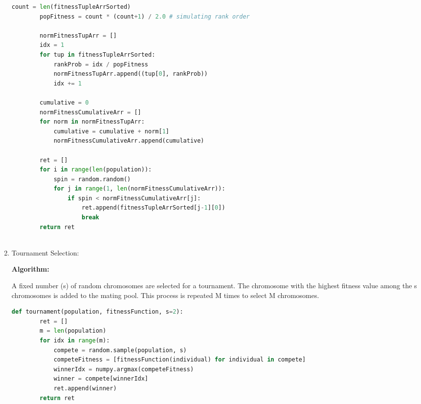 \documentclass[12pt,a4paper]{article}
\begin{document}
\begin{enumerate}
\begin{lstlisting}[language=Python]
        count = len(fitnessTupleArrSorted)
        popFitness = count * (count+1) / 2.0 # simulating rank order
    
        normFitnessTupArr = []
        idx = 1
        for tup in fitnessTupleArrSorted:
            rankProb = idx / popFitness
            normFitnessTupArr.append((tup[0], rankProb))
            idx += 1
    
        cumulative = 0
        normFitnessCumulativeArr = []
        for norm in normFitnessTupArr:
            cumulative = cumulative + norm[1]
            normFitnessCumulativeArr.append(cumulative)
    
        ret = []
        for i in range(len(population)):
            spin = random.random()
            for j in range(1, len(normFitnessCumulativeArr)):
                if spin < normFitnessCumulativeArr[j]:
                    ret.append(fitnessTupleArrSorted[j-1][0])
                    break
        return ret
	        
	\end{lstlisting}

	\item Tournament Selection: \par
	\textbf{Algorithm:} \par
	A fixed number (s) of random chromosomes are selected for a tournament. The chromosome with the highest fitness value among the s chromosomes is added to the mating pool. This process is repeated M times to select M chromosomes.
	\begin{lstlisting}[language=Python]
    def tournament(population, fitnessFunction, s=2):
        ret = []
        m = len(population)
        for idx in range(m):
            compete = random.sample(population, s)
            competeFitness = [fitnessFunction(individual) for individual in compete]
            winnerIdx = numpy.argmax(competeFitness)
            winner = compete[winnerIdx]
            ret.append(winner)
        return ret
	\end{lstlisting}

	\end{enumerate}
\end{document}
